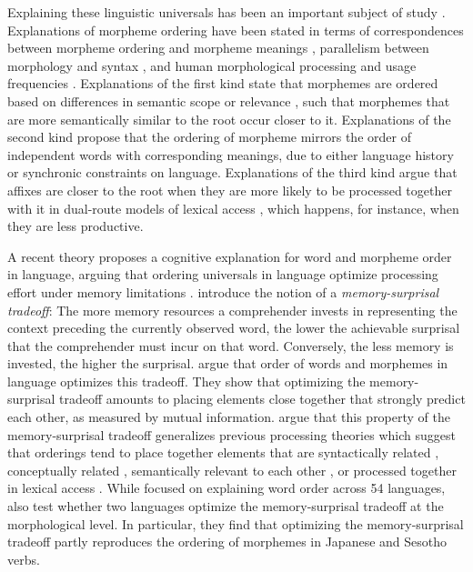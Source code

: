 \documentclass[11pt,letterpaper]{article}
\newcommand{\citep}{\parencite}
\newcommand{\citet}{\Textcite}
\newcommand{\jd}[1]{\textcolor{Pink}{[jd: #1]}}
\begin{document}
Explaining these linguistic universals has been an important subject of study \citep{bybee-morphology-1985, spencer2006linguistic, manova2010modeling, bauer2010an, rice2011principles,hay2004what}.
Explanations of morpheme ordering have been stated in terms of correspondences between morpheme ordering and morpheme meanings \citep{bybee-morphology-1985,rice2000morpheme,saldana2021cross}, parallelism between morphology and syntax \citep{givon1971historical,venneman1973explanation,baker1985the}, and human morphological processing and usage frequencies \citep{hay2002speech, plag2002the, inkelas2016affix}.
Explanations of the first kind state that morphemes are ordered based on differences in semantic scope \citep{rice2000morpheme} or relevance \citep{bybee-morphology-1985}, such that morphemes that are more semantically similar to the root occur closer to it.
Explanations of the second kind propose that the ordering of morpheme mirrors the order of independent words with corresponding meanings, due to either language history or synchronic constraints on language.
Explanations of the third kind argue that affixes are closer to the root when they are more likely to be processed together with it in dual-route models of lexical access \citep{baayen-frequency-1993}, which happens, for instance, when they are less productive.

A recent theory proposes a cognitive explanation for word and morpheme order in language, arguing that ordering universals in language optimize processing effort under memory limitations \citep{Hahn2020modeling}.
\citet{Hahn2020modeling} introduce the notion of a \emph{memory-surprisal tradeoff}: The more memory resources a comprehender invests in representing the context preceding the currently observed word, the lower the achievable surprisal that the comprehender must incur on that word. Conversely, the less memory is invested, the higher the surprisal.
\citet{Hahn2020modeling} argue that order of words and morphemes in language optimizes this tradeoff.
They show that optimizing the memory-surprisal tradeoff amounts to placing elements close together that strongly predict each other, as measured by mutual information.
\citet{Hahn2020modeling} argue that this property of the memory-surprisal tradeoff generalizes previous processing theories which suggest that orderings tend to place together elements that are syntactically related \citep{rijkhoff-word-1986, hawkins-performance-1994}, conceptually related \citep{givon1985iconicity}, semantically relevant to each other \citep{bybee-morphology-1985}, or processed together in lexical access \citep{hay2004what}.
While focused on explaining word order across 54 languages, \citet{Hahn2020modeling} also test whether two languages optimize the memory-surprisal tradeoff at the morphological level. In particular, they find that optimizing the memory-surprisal tradeoff partly reproduces the ordering of morphemes in Japanese and Sesotho verbs.
\end{document}
